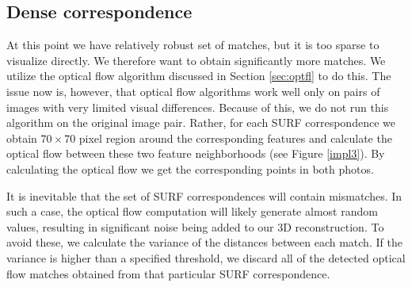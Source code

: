 

\subsection{Dense correspondence}

At this point we have relatively robust set of matches, but it is too sparse to visualize directly.
We therefore want to obtain significantly more matches. 
We utilize the optical flow algorithm discussed in Section \ref{sec:optfl} to do this.
The issue now is, however, that optical flow algorithms work well only on pairs of images with very limited visual differences. 
Because of this, we do not run this algorithm on the original image pair.
Rather, for each SURF correspondence we obtain $70 \times 70$ pixel region around the corresponding features and calculate the optical flow between these two feature neighborhoods (see Figure \ref{impl3}).
By calculating the optical flow we get the corresponding points in both photos. 

It is inevitable that the set of SURF correspondences will contain mismatches.
In such a case, the optical flow computation will likely generate almost random values, resulting in significant noise being added to our 3D reconstruction. 
To avoid these, we calculate the variance of the distances between each match.
If the variance is higher than a specified threshold, we discard all of the detected optical flow matches obtained from that particular SURF correspondence.

